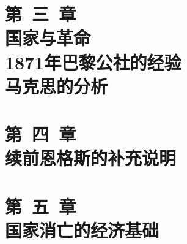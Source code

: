 \documentclass{CR} %
\begin{document}


\part[第三章]{第~三~章 \\ 国家与革命\\ 1871年巴黎公社的经验 \\ 马克思的分析}  



\part[第四章]{第~四~章 \\ 续前\quad 恩格斯的补充说明}  




\part[第五章]{第~五~章 \\ 国家消亡的经济基础}  



\end{document}
